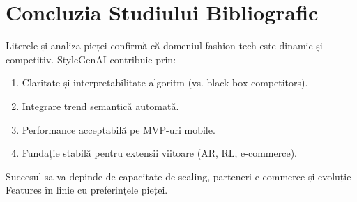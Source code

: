 \section{Concluzia Studiului Bibliografic}

Literele și analiza pieței confirmă că domeniul fashion tech este dinamic și competitiv. StyleGenAI contribuie prin:
\begin{enumerate}
    \item Claritate și interpretabilitate algoritm (vs. black-box competitors).
    \item Integrare trend semantică automată.
    \item Performance acceptabilă pe MVP-uri mobile.
    \item Fundație stabilă pentru extensii viitoare (AR, RL, e-commerce).
\end{enumerate}

Succesul sa va depinde de capacitate de scaling, parteneri e-commerce și evoluție Features în linie cu preferințele pieței.